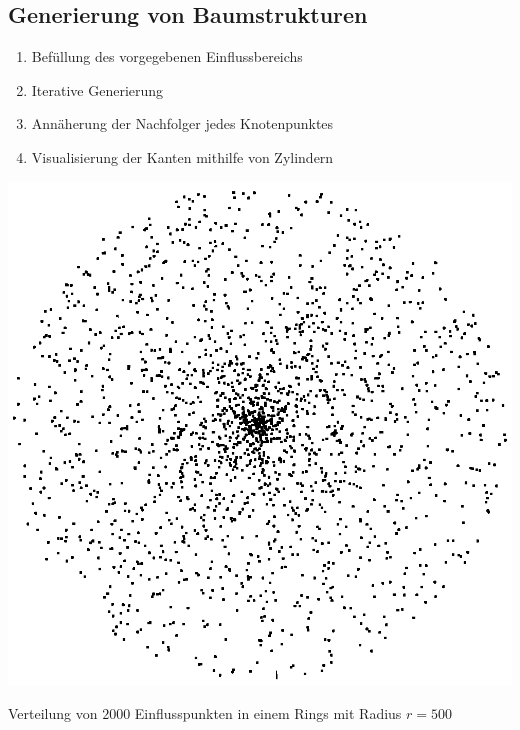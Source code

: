 \newpage
{}
\subsection{Generierung von Baumstrukturen\\}

\begin{enumerate}
	\item Befüllung des vorgegebenen Einflussbereichs\\
	
	\item Iterative Generierung\\
	
	\item Annäherung der Nachfolger jedes Knotenpunktes\\
	
	\item Visualisierung der Kanten mithilfe von Zylindern
\end{enumerate}





\newpage
\begin{center}
	\includegraphics[height=.9\textheight]{images/CH3_SCA_Extended1.png}
	
	Verteilung von $2000$ Einflusspunkten in einem Rings mit Radius $r=500$
\end{center}





